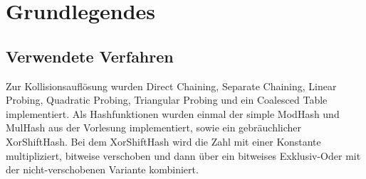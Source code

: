 \chapter{Grundlegendes}
\section{Verwendete Verfahren}
Zur Kollisionsauflösung wurden Direct Chaining, Separate Chaining, Linear Probing, Quadratic Probing, Triangular Probing und ein Coalesced Table implementiert. Als Hashfunktionen wurden einmal der simple ModHash und MulHash aus der Vorlesung implementiert, sowie ein gebräuchlicher XorShiftHash. Bei dem XorShiftHash wird die Zahl mit einer Konstante multipliziert, bitweise verschoben und dann über ein bitweises Exklusiv-Oder mit der nicht-verschobenen Variante kombiniert.